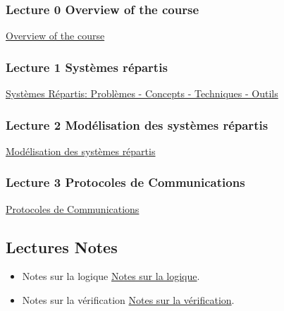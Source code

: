 \documentclass[ 12pt]{article}
\begin{document}
\subsubsection{Lecture 0 {Overview of the course }}
  
  \href{http://mery54.github.io/teaching/aspd/lecturesnotes/ASPD0.pdf}{Overview of the course }


\subsubsection{Lecture 1 {Systèmes répartis}}
  
\href{http://mery54.github.io/teaching/aspd/lecturesnotes/ASPD1.pdf}{Syst\`emes
  R\'epartis: Probl\`emes  - Concepts - Techniques - Outils}



\subsubsection{Lecture 2 {Mod\'elisation   des syst\`emes  r\'epartis}}
  
\href{http://mery54.github.io/teaching/aspd/lecturesnotes/ASPD2.pdf}{Mod\'elisation   des syst\`emes  r\'epartis}




\subsubsection{Lecture 3 {Protocoles de Communications}}
  
\href{http://mery54.github.io/teaching/aspd/lecturesnotes/ASPD3.pdf}{Protocoles de Communications}



  \subsection{Lectures Notes}

  \begin{itemize}
  \item[]   Notes sur la logique
    \href{http://mery54.github.io/teaching/movex/lecturesnotes/preprint-chapterlogique.pdf}{Notes sur la logique}.

     \item[]   Notes sur la vérification
    \href{http://mery54.github.io/teaching/movex/lecturesnotes/preprint-chapterverification.pdf}{Notes sur la vérification}.

  \end{itemize}
\end{document}
